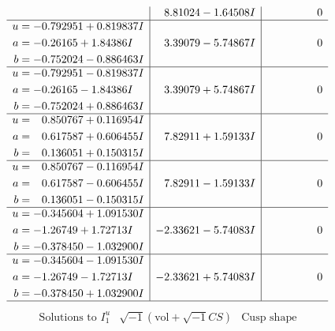 \documentclass[1p]{elsarticle_modified}
\theoremstyle{definition}
\newcommand{\I}{\sqrt{-1}}
\begin{document}
$$\begin{array}{c|c|c}
 & \phantom{-}8.81024 - 1.64508 I & \phantom{-0.000000 } 0 \\ \hline\begin{aligned}
u &= -0.792951 + 0.819837 I \\
a &= -0.26165 + 1.84386 I \\
b &= -0.752024 - 0.886463 I\end{aligned}
 & \phantom{-}3.39079 - 5.74867 I & \phantom{-0.000000 } 0 \\ \hline\begin{aligned}
u &= -0.792951 - 0.819837 I \\
a &= -0.26165 - 1.84386 I \\
b &= -0.752024 + 0.886463 I\end{aligned}
 & \phantom{-}3.39079 + 5.74867 I & \phantom{-0.000000 } 0 \\ \hline\begin{aligned}
u &= \phantom{-}0.850767 + 0.116954 I \\
a &= \phantom{-}0.617587 + 0.606455 I \\
b &= \phantom{-}0.136051 + 0.150315 I\end{aligned}
 & \phantom{-}7.82911 + 1.59133 I & \phantom{-0.000000 } 0 \\ \hline\begin{aligned}
u &= \phantom{-}0.850767 - 0.116954 I \\
a &= \phantom{-}0.617587 - 0.606455 I \\
b &= \phantom{-}0.136051 - 0.150315 I\end{aligned}
 & \phantom{-}7.82911 - 1.59133 I & \phantom{-0.000000 } 0 \\ \hline\begin{aligned}
u &= -0.345604 + 1.091530 I \\
a &= -1.26749 + 1.72713 I \\
b &= -0.378450 - 1.032900 I\end{aligned}
 & -2.33621 - 5.74083 I & \phantom{-0.000000 } 0 \\ \hline\begin{aligned}
u &= -0.345604 - 1.091530 I \\
a &= -1.26749 - 1.72713 I \\
b &= -0.378450 + 1.032900 I\end{aligned}
 & -2.33621 + 5.74083 I & \phantom{-0.000000 } 0\\
 \hline 
 \end{array}$$\newpage$$\begin{array}{c|c|c}  
\text{Solutions to }I^u_{1}& \I (\text{vol} + \sqrt{-1}CS) & \text{Cusp shape}\\

\end{array}$$
\end{document}
